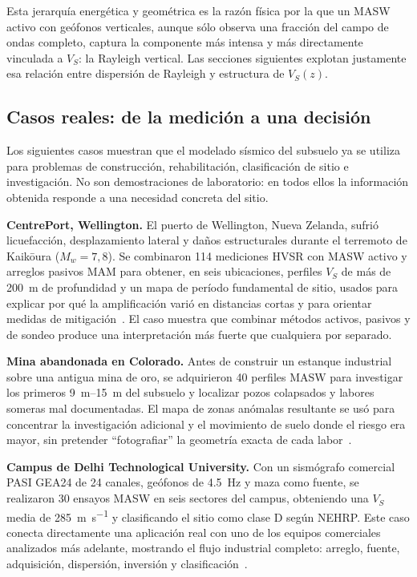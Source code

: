 Esta jerarquía energética y geométrica es la razón física por la que un MASW activo con
geófonos verticales, aunque sólo observa una fracción del campo de ondas completo,
captura la componente más intensa y más directamente vinculada a $V_S$: la Rayleigh
vertical. Las secciones siguientes explotan justamente esa relación entre dispersión de
Rayleigh y estructura de $V_S(z)$.

\subsection{Casos reales: de la medición a una decisión}

Los siguientes casos muestran que el modelado sísmico del subsuelo ya se utiliza para
problemas de construcción, rehabilitación, clasificación de sitio e investigación. No
son demostraciones de laboratorio: en todos ellos la información obtenida responde a
una necesidad concreta del sitio.

\textbf{CentrePort, Wellington.} El puerto de Wellington, Nueva Zelanda, sufrió
licuefacción, desplazamiento lateral y daños estructurales durante el terremoto de
Kaik\={o}ura ($M_w=7{,}8$). Se combinaron 114 mediciones HVSR con MASW activo y arreglos
pasivos MAM para obtener, en seis ubicaciones, perfiles $V_S$ de más de \SI{200}{\meter}
de profundidad y un mapa de período fundamental de sitio, usados para explicar por qué
la amplificación varió en distancias cortas y para orientar medidas de
mitigación~\cite{Vantassel2018}. El caso muestra que combinar métodos activos, pasivos y
de sondeo produce una interpretación más fuerte que cualquiera por separado.

\textbf{Mina abandonada en Colorado.} Antes de construir un estanque industrial sobre
una antigua mina de oro, se adquirieron 40 perfiles MASW para investigar los primeros
\SIrange{9}{15}{\meter} del subsuelo y localizar pozos colapsados y labores someras mal
documentadas. El mapa de zonas anómalas resultante se usó para concentrar la
investigación adicional y el movimiento de suelo donde el riesgo era mayor, sin pretender
``fotografiar'' la geometría exacta de cada labor~\cite{Crook2017}.

\textbf{Campus de Delhi Technological University.} Con un sismógrafo comercial PASI
GEA24 de 24 canales, geófonos de \SI{4.5}{\hertz} y maza como fuente, se realizaron 30
ensayos MASW en seis sectores del campus, obteniendo una $V_S$ media de
\SI{285}{\meter\per\second} y clasificando el sitio como clase D según NEHRP. Este caso
conecta directamente una aplicación real con uno de los equipos comerciales analizados
más adelante, mostrando el flujo industrial completo: arreglo, fuente, adquisición,
dispersión, inversión y clasificación~\cite{Gautam2020}.

